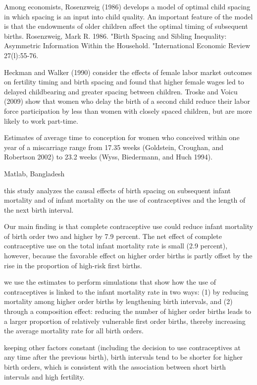 Among economists, Rosenzweig (1986) develops a model of optimal child spacing
in which spacing is an input into child quality. An important feature of the model
is that the endowments of older children affect the optimal timing of subsequent
births.
Rosenzweig, Mark R. 1986. "Birth Spacing and Sibling Inequality: Asymmetric Information
Within the Household. "International Economic Review 27(l):55-76. 

Heckman and Walker (1990) consider the effects of female labor market outcomes
on fertility timing and birth spacing and found that higher female wages led to
delayed childbearing and greater spacing between children. Troske and Voicu (2009)
show that women who delay the birth of a second child reduce their labor force
participation by less than women with closely spaced children, but are more likely
to work part-time.

Estimates of average time to conception for women who conceived within one year of 
a miscarriage range from 17.35 weeks (Goldstein, Croughan, and Robertson 2002) to 23.2
weeks (Wyss, Biedermann, and Huch 1994).

\citet{Saha2013}

Matlab, Bangladesh

this study analyzes the causal effects of birth spacing on subsequent
infant mortality and of infant mortality on the use of contraceptives
and the length of the next birth interval.

Our main finding is that complete contraceptive use could reduce infant
mortality of birth order two and higher by 7.9 percent. The net effect
of complete contraceptive use on the total infant mortality rate is
small (2.9 percent), however, because the favorable effect on higher
order births is partly offset by the rise in the proportion of high-risk
first births.

we use the estimates to perform simulations that show how the use of
contraceptives is linked to the infant mortality rate in two ways: (1)
by reducing mortality among higher order births by lengthening birth
intervals, and (2) through a composition effect: reducing the number of
higher order births leads to a larger proportion of relatively
vulnerable first order births, thereby increasing the average mortality
rate for all birth orders.

keeping other factors constant (including the decision to use
contraceptives at any time after the previous birth), birth intervals
tend to be shorter for higher birth orders, which is consistent with the
association between short birth intervals and high fertility.

